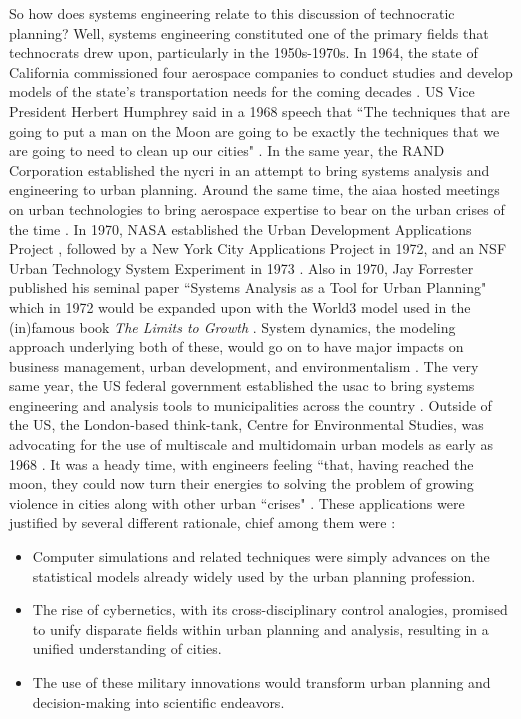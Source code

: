 So how does systems engineering relate to this discussion of technocratic planning? Well, systems engineering constituted one of the primary fields that technocrats drew upon, particularly in the 1950s-1970s. In 1964, the state of California commissioned four aerospace companies to conduct studies and develop models of the state's transportation needs for the coming decades \cite{smithSystemsApproachUrban1968}. US Vice President Herbert Humphrey said in a 1968 speech that ``The techniques that are going to put a man on the Moon are going to be exactly the techniques that we are going to need to clean up our cities" \cite{lightWarfareWelfareDefense2005}. In the same year, the RAND Corporation established the \ac{nycri} in an attempt to bring systems analysis and engineering to urban planning. Around the same time, the \ac{aiaa} hosted meetings on urban technologies to bring aerospace expertise to bear on the urban crises of the time \cite{lightWarfareWelfareDefense2005}. In 1970, NASA established the Urban Development Applications Project \cite{fosterUrbanDevelopmentApplications1970}, followed by a New York City Applications Project in 1972, and an NSF Urban Technology System Experiment in 1973 \cite{karenTechnologyTransferNew1973}. Also in 1970, Jay Forrester published his seminal paper ``Systems Analysis as a Tool for Urban Planning" \cite{forresterSystemsAnalysisTool1970} which in 1972 would be expanded upon with the World3 model used in the (in)famous book \textit{The Limits to Growth} \cite{meadowsLimitsGrowth1972}. System dynamics, the modeling approach underlying both of these, would go on to have major impacts on business management, urban development, and environmentalism \cite{forresterSystemDynamicsPersonal2007a}. The very same year, the US federal government established the \ac{usac} to bring systems engineering and analysis tools to municipalities across the country \cite{kraemerRequiemUSAC1979}. Outside of the US, the London-based think-tank, Centre for Environmental Studies, was advocating for the use of multiscale and multidomain urban models as early as 1968 \cite{wilsonModellingSystemsAnalysis1968}. It was a heady time, with engineers feeling ``that, having reached the moon, they could now turn their energies to solving the problem of growing violence in cities along with other urban ``crises" \cite{mazza2017}. These applications were justified by several different rationale, chief among them were \cite{lightWarfareWelfareDefense2005}: 

\begin{itemize} \setlength{\itemsep}{0pt} \setlength{\parskip}{0pt} 
	\item{Computer simulations and related techniques were simply advances on the statistical models already widely used by the urban planning profession.}
	\item{The rise of cybernetics, with its cross-disciplinary control analogies, promised to unify disparate fields within urban planning and analysis, resulting in a unified understanding of cities.}
	\item{The use of these military innovations would transform urban planning and decision-making into scientific endeavors.}
\end{itemize}

